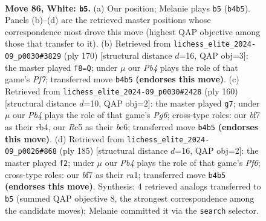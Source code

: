 \documentclass[11pt]{article}
\begin{document}
\clearpage

\begin{figure}[p]\centering
\begin{subfigure}{0.46\textwidth}\centering
\resizebox{\linewidth}{!}{%
\newchessgame
\chessboard[
  setfen={1R6/3k1br1/8/2R5/1P2K3/8/8/8 w - - 45 86},
  showmover=false,
  pgfstyle=straightmove, color=movearrow, markmove={b4-b5}
]}
\caption{}
\end{subfigure}\hfill
\begin{subfigure}{0.46\textwidth}\centering
\resizebox{\linewidth}{!}{%
\newchessgame
\chessboard[
  setfen={4R3/5P2/6K1/3k4/3b4/8/8/8 w - - 9 86},
  showmover=false,
  pgfstyle=straightmove, color=movearrow, markmove={f7-f8}
]}
\caption{}
\end{subfigure}
\\[4pt]
\begin{subfigure}{0.46\textwidth}\centering
\resizebox{\linewidth}{!}{%
\newchessgame
\chessboard[
  setfen={8/8/3kb1P1/6R1/1r6/4K3/8/8 w - - 2 81},
  showmover=false,
  pgfstyle=straightmove, color=movearrow, markmove={g6-g7}
]}
\caption{}
\end{subfigure}\hfill
\begin{subfigure}{0.46\textwidth}\centering
\resizebox{\linewidth}{!}{%
\newchessgame
\chessboard[
  setfen={8/8/8/8/7K/4kp2/6r1/R7 b - - 25 93},
  showmover=false,
  pgfstyle=straightmove, color=movearrow, markmove={f3-f2}
]}
\caption{}
\end{subfigure}
\caption{\textbf{Move 86, White: \texttt{b5}.} (a) Our position; Melanie plays \texttt{b5} (\texttt{b4b5}). Panels (b)--(d) are the retrieved master positions whose correspondence most drove this move (highest QAP objective among those that transfer to it). (b) Retrieved from \texttt{lichess\_elite\_2024-09\_p0030\#3829} (ply 170) [structural distance $d$=16, QAP obj=3]: the master played \texttt{f8=Q}; under $\mu$ our \emph{Pb4} plays the role of that game's \emph{Pf7}; transferred move \texttt{b4b5} \textbf{(endorses this move)}. (c) Retrieved from \texttt{lichess\_elite\_2024-09\_p0030\#2428} (ply 160) [structural distance $d$=10, QAP obj=2]: the master played \texttt{g7}; under $\mu$ our \emph{Pb4} plays the role of that game's \emph{Pg6}; cross-type roles: our \emph{b}f7 as their \emph{r}b4, our \emph{R}c5 as their \emph{b}e6; transferred move \texttt{b4b5} \textbf{(endorses this move)}. (d) Retrieved from \texttt{lichess\_elite\_2024-09\_p0026\#868} (ply 185) [structural distance $d$=16, QAP obj=2]: the master played \texttt{f2}; under $\mu$ our \emph{Pb4} plays the role of that game's \emph{Pf6}; cross-type roles: our \emph{b}f7 as their \emph{r}a1; transferred move \texttt{b4b5} \textbf{(endorses this move)}. Synthesis: 4 retrieved analogs transferred to \texttt{b5} (summed QAP objective 8, the strongest correspondence among the candidate moves); Melanie committed it via the \texttt{search} selector.}
\label{fig:thought-m170}
\end{figure}
\end{document}
